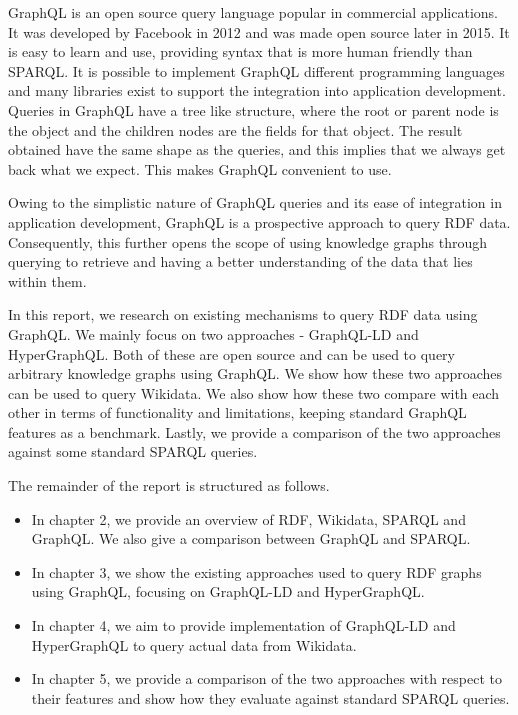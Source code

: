 GraphQL is an open source query language popular in commercial applications. It was developed by Facebook in 2012 and was made open source later in 2015. It is easy to learn and use, providing syntax that is more human friendly than SPARQL. It is possible to implement GraphQL  different programming languages and many libraries exist to support the integration into application development. Queries in GraphQL have a tree like structure, where the root or parent node is the object and the children nodes are the fields for that object. The result obtained have the same shape as the queries, and this implies that we always get back what we expect. This makes GraphQL convenient to use.

Owing to the simplistic nature of GraphQL queries and its ease of integration in application development, GraphQL is a prospective approach to query RDF data. Consequently, this further opens the scope of using knowledge graphs through querying to retrieve and having a better understanding of the data that lies within them.

In this report, we research on existing mechanisms to query RDF data using GraphQL. We mainly focus on two approaches - GraphQL-LD and HyperGraphQL. Both of these are open source and can be used to query arbitrary knowledge graphs using GraphQL. We show how these two approaches can be used to query Wikidata. We also show how these two compare with each other in terms of functionality and limitations, keeping standard GraphQL features as a benchmark. Lastly, we provide a comparison of the two approaches against some standard SPARQL queries.


The remainder of the report is structured as follows.
\begin{itemize}
	\item In chapter 2, we provide an overview of RDF, Wikidata, SPARQL and GraphQL. We also give a comparison between GraphQL and SPARQL.
	\item In chapter 3, we show the existing approaches used to query RDF graphs using GraphQL, focusing on GraphQL-LD and HyperGraphQL.
	\item In chapter 4, we aim to provide implementation of GraphQL-LD and HyperGraphQL to query actual data from Wikidata.
	\item In chapter 5, we provide a comparison of the two approaches with respect to their features and show how they evaluate against standard SPARQL queries.
\end{itemize}
